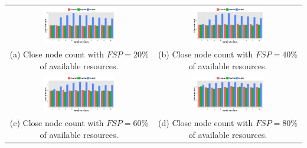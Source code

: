 \documentclass{acm_proc_article-sp}
\begin{document}
\begin{table}[t]
 \centering
 \begin{tabular}{cc}
    \includegraphics[width=0.5\textwidth]{figuresPng/fsTwentyPerc.png} &  \includegraphics[width=0.5\textwidth]{figuresPng/fsFourtyPerc.png}\\
    (a) Close node count with $FSP = 20\%$ of available resources. & (b) Close node count with $FSP = 40\%$ of available resources.\\
    \includegraphics[width=0.5\textwidth]{figuresPng/fsSixtyPerc.png} &  \includegraphics[width=0.5\textwidth]{figuresPng/fsEightyPerc.png}\\
      (c) Close node count with $FSP = 60\%$ of available resources. & (d) Close node count with $FSP = 80\%$ of available resources.\\
 \end{tabular}
\label{fig:clusteredResults}
\end{table}
\end{document}
